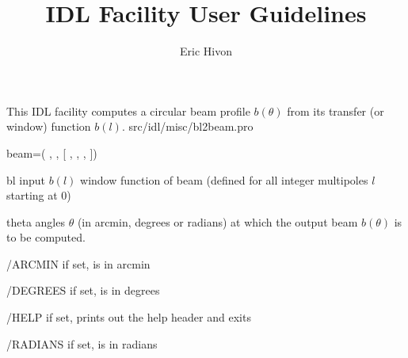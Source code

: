 

\sloppy

\title{\healpix IDL Facility User Guidelines}
 \section[bl2beam]{ }
\label{idl:bl2beam}
\author{Eric Hivon}

\begin{facility}
{This IDL facility computes a circular beam profile $b(\theta)$ from its transfer (or window) function $b(l)$.
}
{src/idl/misc/bl2beam.pro}
\end{facility}

\begin{IDLformat}
{%
{beam}=\thedocid(
, 
, %
[%
 ,
, 
, 
%
])}
\end{IDLformat}

\begin{qualifiers}
  \begin{qulist}{} %
    \item[bl] %
      input $b(l)$ window function of beam (defined for all integer multipoles $l$ starting at 0)
    \item[theta] %
    angles $\theta$ (in arcmin, degrees or radians) 
  at which the output beam $b(\theta)$ is to be computed.
  \end{qulist}
\end{qualifiers}

\begin{keywords}
  \begin{kwlist}{} %
    \item[/ARCMIN] %
	if set,  is in arcmin
    \item[/DEGREES] %
	if set,  is in degrees
    \item[/HELP] %
	if set, prints out the help header and exits
    \item[/RADIANS] %
	if set,  is in radians
  \end{kwlist}
\end{keywords}  

